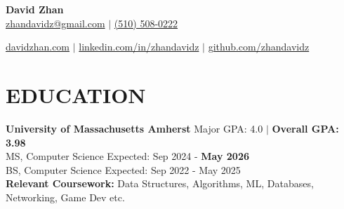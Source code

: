 \documentclass[letterpaper,10pt]{extarticle}
\begin{document}
\pagestyle{empty}

\begin{center}
\textbf{\Large David Zhan}\\[2pt] %

\href{mailto:zhandavidz@gmail.com}{zhandavidz@gmail.com} $|$ \href{tel:5105080222}{(510) 508-0222}

\href{https://davidzhan.com}{davidzhan.com} $|$ \href{https://www.linkedin.com/in/zhandavidz}{linkedin.com/in/zhandavidz} $|$ \href{https://github.com/zhandavidz}{github.com/zhandavidz}


\end{center}

\section*{EDUCATION}
\noindent
\textbf{University of Massachusetts Amherst} \hfill Major GPA: 4.0 $|$ \textbf{Overall GPA: 3.98}\\
MS, Computer Science \hfill Expected: Sep 2024 - \textbf{May 2026}\\
BS, Computer Science \hfill Expected: Sep 2022 - May 2025\\

\noindent
\textbf{Relevant Coursework:} Data Structures, Algorithms, ML, Databases, Networking, Game Dev etc.




\end{document}
